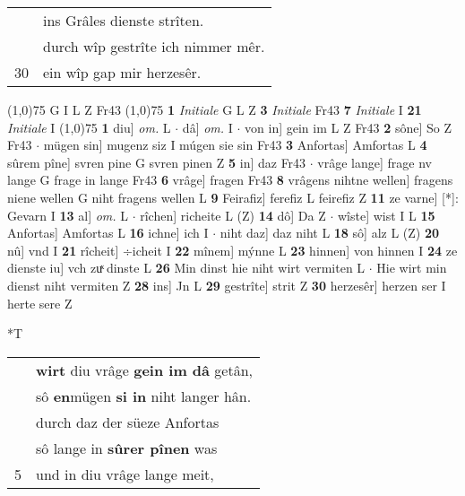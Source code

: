 \documentclass[8pt,a4paper,notitlepage]{article}
\begin{document}
\begin{table}[ht]
\begin{minipage}[t]{0.5\linewidth}
\begin{tabular}{rl}
 & ins Grâles dienste strîten.\\ 
 & durch wîp gestrîte ich nimmer mêr.\\ 
30 & ein wîp gap mir herzesêr.\\ 
\end{tabular}
\scriptsize
\line(1,0){75} \newline
G I L Z Fr43 \newline
\line(1,0){75} \newline
\textbf{1} \textit{Initiale} G L Z  \textbf{3} \textit{Initiale} Fr43  \textbf{7} \textit{Initiale} I  \textbf{21} \textit{Initiale} I  \newline
\line(1,0){75} \newline
\textbf{1} diu] \textit{om.} L  $\cdot$ dâ] \textit{om.} I  $\cdot$ von in] gein im L Z Fr43 \textbf{2} sône] So Z Fr43  $\cdot$ mügen sin] mugenz siz I múgen sie sin Fr43 \textbf{3} Anfortas] Amfortas L \textbf{4} sûrem pîne] svren pine G svren pinen Z \textbf{5} in] daz Fr43  $\cdot$ vrâge lange] frage nv lange G frage in lange Fr43 \textbf{6} vrâge] fragen Fr43 \textbf{8} vrâgens nihtne wellen] fragens niene wellen G niht fragens wellen L \textbf{9} Feirafiz] ferefiz L feirefiz Z \textbf{11} ze varne] [*]: Gevarn I \textbf{13} al] \textit{om.} L  $\cdot$ rîchen] richeite L (Z) \textbf{14} dô] Da Z  $\cdot$ wîste] wist I L \textbf{15} Anfortas] Amfortas L \textbf{16} ichne] ich I  $\cdot$ niht daz] daz niht L \textbf{18} sô] alz L (Z) \textbf{20} nû] vnd I \textbf{21} rîcheit] ÷icheit I \textbf{22} mînem] mýnne L \textbf{23} hinnen] von hinnen I \textbf{24} ze dienste iu] vch zuͯ dinste L \textbf{26} Min dinst hie niht wirt vermiten L  $\cdot$ Hie wirt min dienst niht vermiten Z \textbf{28} ins] Jn L \textbf{29} gestrîte] strit Z \textbf{30} herzesêr] herzen ser I herte sere Z \newline
\end{minipage}
\hspace{0.5cm}
\begin{minipage}[t]{0.5\linewidth}
\small
\begin{center}*T
\end{center}
\begin{tabular}{rl}
 & \textbf{wirt} diu vrâge \textbf{gein im dâ} getân,\\ 
 & sô \textbf{en}mügen \textbf{si in} niht langer hân.\\ 
 & durch daz der süeze Anfortas\\ 
 & sô lange in \textbf{sûrer pînen} was\\ 
5 & und in diu vrâge lange meit,\\ 

\end{tabular}
\end{minipage}
\end{table}
\end{document}
